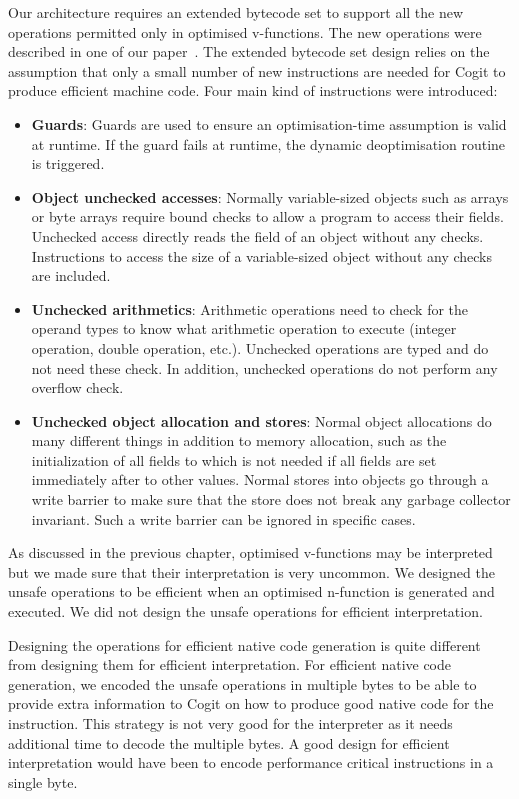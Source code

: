 \documentclass[a4paper,12pt,twoside]{../includes/ThesisStyle}
\begin{document}
Our architecture requires an extended bytecode set to support all the new operations permitted only in optimised v-functions. The new operations were described in one of our paper~\cite{Bera14a}. The extended bytecode set design relies on the assumption that only a small number of new instructions are needed for Cogit to produce efficient machine code. Four main kind of instructions were introduced:
\begin{itemize}
\item \textbf{Guards}: Guards are used to ensure an optimisation-time assumption is valid at runtime. If the guard fails at runtime, the dynamic deoptimisation routine is triggered.
\item \textbf{Object unchecked accesses}: Normally variable-sized objects such as arrays or byte arrays require bound checks to allow a program to access their fields. Unchecked access directly reads the field of an object without any checks. Instructions to access the size of a variable-sized object without any checks are included.
\item \textbf{Unchecked arithmetics}: Arithmetic operations need to check for the operand types to know what arithmetic operation to execute (integer operation, double operation, etc.). Unchecked operations are typed and do not need these check. In addition, unchecked operations do not perform any overflow check.
\item \textbf{Unchecked object allocation and stores}: Normal object allocations do many different things in addition to memory allocation, such as the initialization of all fields to  which is not needed if all fields are set immediately after to other values. Normal stores into objects go through a write barrier to make sure that the store does not break any garbage collector invariant. Such a write barrier can be ignored in specific cases.
\end{itemize}

As discussed in the previous chapter, optimised v-functions may be interpreted but we made sure that their interpretation is very uncommon. We designed the unsafe operations to be efficient when an optimised n-function is generated and executed. We did not design the unsafe operations for efficient interpretation. 

Designing the operations for efficient native code generation is quite different from designing them for efficient interpretation. For efficient native code generation, we encoded the unsafe operations in multiple bytes to be able to provide extra information to Cogit on how to produce good native code for the instruction. This strategy is not very good for the interpreter as it needs additional time to decode the multiple bytes. A good design for efficient interpretation would have been to encode performance critical instructions in a single byte.
\end{document}
